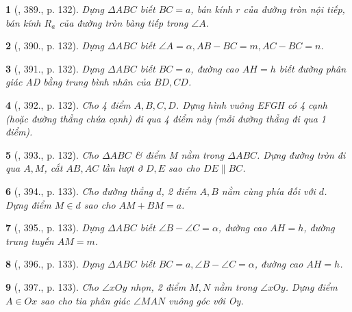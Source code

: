 \documentclass{article}
\newtheorem{baitoan}{}
\begin{document}
\begin{baitoan}[\cite{Binh_Toan_9_tap_2}, 389., p. 132]
	Dựng $\Delta ABC$ biết $BC = a$, bán kính $r$ của đường tròn nội tiếp, bán kính $R_a$ của đường tròn bàng tiếp trong $\angle{A}$.
\end{baitoan}

\begin{baitoan}[\cite{Binh_Toan_9_tap_2}, 390., p. 132]
	Dựng $\Delta ABC$ biết $\angle{A} = \alpha,AB - BC = m,AC - BC = n$.
\end{baitoan}

\begin{baitoan}[\cite{Binh_Toan_9_tap_2}, 391., p. 132]
	Dựng $\Delta ABC$ biết $BC = a$, đường cao $AH = h$ biết đường phân giác AD bằng trung bình nhân của $BD,CD$.
\end{baitoan}

\begin{baitoan}[\cite{Binh_Toan_9_tap_2}, 392., p. 132]
	Cho 4 điểm $A,B,C,D$. Dựng hình vuông EFGH có 4 cạnh (hoặc đường thẳng chứa cạnh) đi qua 4 điểm này (mỗi đường thẳng đi qua 1 điểm).
\end{baitoan}

\begin{baitoan}[\cite{Binh_Toan_9_tap_2}, 393., p. 132]
	Cho $\Delta ABC$ \& điểm M nằm trong $\Delta ABC$. Dựng đường tròn đi qua $A,M$, cắt $AB,AC$ lần lượt ở $D,E$ sao cho $DE\parallel BC$.
\end{baitoan}

\begin{baitoan}[\cite{Binh_Toan_9_tap_2}, 394., p. 133]
	Cho đường thẳng $d$, 2 điểm $A,B$ nằm cùng phía đối với $d$. Dựng điểm $M\in d$ sao cho $AM + BM = a$.
\end{baitoan}

\begin{baitoan}[\cite{Binh_Toan_9_tap_2}, 395., p. 133]
	Dựng $\Delta ABC$ biết $\angle{B} - \angle{C} = \alpha$, đường cao $AH = h$, đường trung tuyến $AM = m$.
\end{baitoan}

\begin{baitoan}[\cite{Binh_Toan_9_tap_2}, 396., p. 133]
	Dựng $\Delta ABC$ biết $BC = a,\angle{B} - \angle{C} = \alpha$, đường cao $AH = h$.
\end{baitoan}

\begin{baitoan}[\cite{Binh_Toan_9_tap_2}, 397., p. 133]
	Cho $\angle{xOy}$ nhọn, 2 điểm $M,N$ nằm trong $\angle{xOy}$. Dựng điểm $A\in Ox$ sao cho tia phân giác $\angle{MAN}$ vuông góc với Oy.
\end{baitoan}
\end{document}
